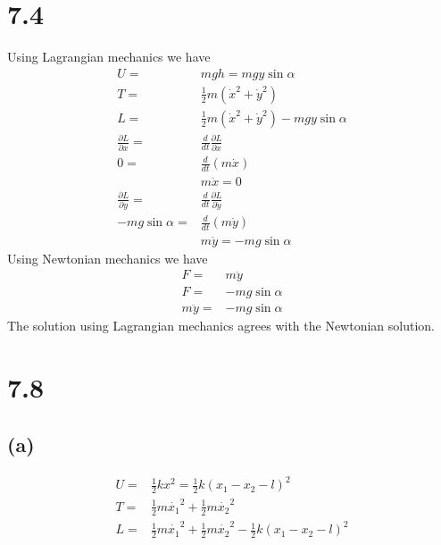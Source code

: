 \documentclass[12pt, a4paper]{article}
\begin{document}
\section{7.4}
Using Lagrangian mechanics we have
\begin{align*}
U =& mgh = mgy\sin\alpha
\\
T =& \frac{1}{2}m(\dot{x}^2+\dot{y}^2)
\\
L =& \frac{1}{2}m(\dot{x}^2+\dot{y}^2) - mgy\sin\alpha
\\
\frac{\partial L}{\partial x} =& \frac{d}{dt}\frac{\partial L}{\partial\dot{x}}
\\
0 =& \frac{d}{dt}(m\dot{x})
\\
&\boxed{m\ddot{x} = 0}
\\
\frac{\partial L}{\partial y} =& \frac{d}{dt}\frac{\partial L}{\partial\dot{y}}
\\
-mg\sin\alpha =& \frac{d}{dt}(m\dot{y})
\\
&\boxed{m\ddot{y} = -mg\sin\alpha}
\end{align*}
Using Newtonian mechanics we have
\begin{align}
F =& m\ddot{y}
\\
F =& -mg\sin\alpha
\\
m\ddot{y} =& -mg\sin\alpha
\end{align}
The solution using Lagrangian mechanics agrees with the Newtonian solution.



\section{7.8}
\subsection{(a)}
\begin{align*}
U =& \tfrac{1}{2}kx^2 = \tfrac{1}{2}k(x_1-x_2-l)^2
\\
T =& \tfrac{1}{2}m\dot{x_1}^2 + \tfrac{1}{2}m\dot{x_2}^2
\\
L =& \tfrac{1}{2}m\dot{x_1}^2 + \tfrac{1}{2}m\dot{x_2}^2 - \tfrac{1}{2}k(x_1-x_2-l)^2
\end{align*}
\end{document}

